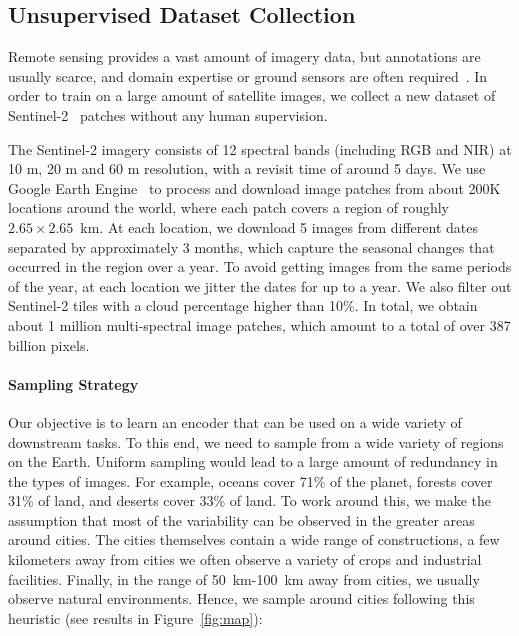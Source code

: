 \documentclass[10pt,twocolumn,letterpaper]{article}
\begin{document}
\subsection{Unsupervised Dataset Collection}
\label{ssec:dataset_collection}
Remote sensing provides a vast amount of imagery data, but annotations are usually scarce, and domain expertise or ground sensors are often required~\cite{jean2016combining}. In order to train on a large amount of satellite images, we collect a new dataset of Sentinel-2~\cite{drusch2012sentinel} patches without any human supervision.

The Sentinel-2 imagery consists of 12 spectral bands (including RGB and NIR) at 10 m, 20 m and 60 m resolution, with a revisit time of around 5 days. We use Google Earth Engine~\cite{gorelick2017google} to process and download image patches from about 200K locations around the world, where each patch covers a region of roughly $2.65 \times 2.65$~km. At each location, we download 5 images from different dates separated by approximately 3 months, which capture the seasonal changes that occurred in the region over a year. To avoid getting images from the same periods of the year, at each location we jitter the dates for up to a year. We also filter out Sentinel-2 tiles with a cloud percentage higher than 10\%. In total, we obtain about 1 million multi-spectral image patches, which amount to a total of over 387 billion pixels.

\vspace{-1em}\paragraph{Sampling Strategy} Our objective is to learn an encoder that can be used on a wide variety of downstream tasks. To this end, we need to sample from a wide variety of regions on the Earth. Uniform sampling would lead to a large amount of redundancy in the types of images. For example, oceans cover 71\% of the planet, forests cover 31\% of land, and deserts cover 33\% of land. To work around this, we make the assumption that most of the variability can be observed in the greater areas around cities. The cities themselves contain a wide range of constructions, a few kilometers away from cities we often observe a variety of crops and industrial facilities. Finally, in the range of 50~km-100~km away from cities, we usually observe natural environments. Hence, we sample around cities following this heuristic (see results in Figure~\ref{fig:map}):
\end{document}
